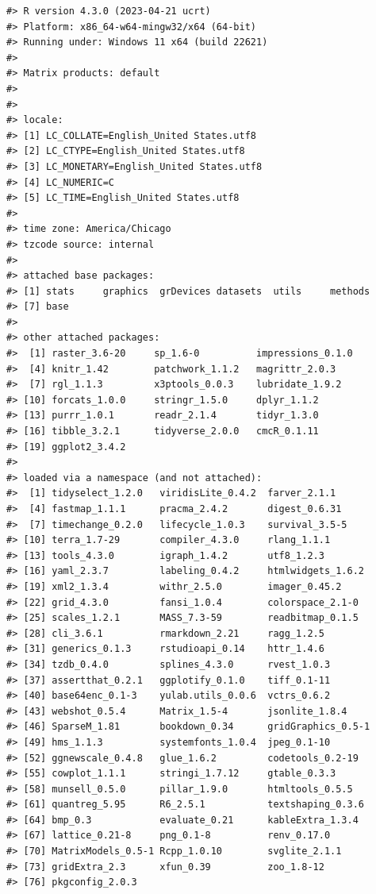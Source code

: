 \documentclass[11pt,]{isuthesis}
\begin{document}
\begin{verbatim}
#> R version 4.3.0 (2023-04-21 ucrt)
#> Platform: x86_64-w64-mingw32/x64 (64-bit)
#> Running under: Windows 11 x64 (build 22621)
#> 
#> Matrix products: default
#> 
#> 
#> locale:
#> [1] LC_COLLATE=English_United States.utf8 
#> [2] LC_CTYPE=English_United States.utf8   
#> [3] LC_MONETARY=English_United States.utf8
#> [4] LC_NUMERIC=C                          
#> [5] LC_TIME=English_United States.utf8    
#> 
#> time zone: America/Chicago
#> tzcode source: internal
#> 
#> attached base packages:
#> [1] stats     graphics  grDevices datasets  utils     methods  
#> [7] base     
#> 
#> other attached packages:
#>  [1] raster_3.6-20     sp_1.6-0          impressions_0.1.0
#>  [4] knitr_1.42        patchwork_1.1.2   magrittr_2.0.3   
#>  [7] rgl_1.1.3         x3ptools_0.0.3    lubridate_1.9.2  
#> [10] forcats_1.0.0     stringr_1.5.0     dplyr_1.1.2      
#> [13] purrr_1.0.1       readr_2.1.4       tidyr_1.3.0      
#> [16] tibble_3.2.1      tidyverse_2.0.0   cmcR_0.1.11      
#> [19] ggplot2_3.4.2    
#> 
#> loaded via a namespace (and not attached):
#>  [1] tidyselect_1.2.0   viridisLite_0.4.2  farver_2.1.1      
#>  [4] fastmap_1.1.1      pracma_2.4.2       digest_0.6.31     
#>  [7] timechange_0.2.0   lifecycle_1.0.3    survival_3.5-5    
#> [10] terra_1.7-29       compiler_4.3.0     rlang_1.1.1       
#> [13] tools_4.3.0        igraph_1.4.2       utf8_1.2.3        
#> [16] yaml_2.3.7         labeling_0.4.2     htmlwidgets_1.6.2 
#> [19] xml2_1.3.4         withr_2.5.0        imager_0.45.2     
#> [22] grid_4.3.0         fansi_1.0.4        colorspace_2.1-0  
#> [25] scales_1.2.1       MASS_7.3-59        readbitmap_0.1.5  
#> [28] cli_3.6.1          rmarkdown_2.21     ragg_1.2.5        
#> [31] generics_0.1.3     rstudioapi_0.14    httr_1.4.6        
#> [34] tzdb_0.4.0         splines_4.3.0      rvest_1.0.3       
#> [37] assertthat_0.2.1   ggplotify_0.1.0    tiff_0.1-11       
#> [40] base64enc_0.1-3    yulab.utils_0.0.6  vctrs_0.6.2       
#> [43] webshot_0.5.4      Matrix_1.5-4       jsonlite_1.8.4    
#> [46] SparseM_1.81       bookdown_0.34      gridGraphics_0.5-1
#> [49] hms_1.1.3          systemfonts_1.0.4  jpeg_0.1-10       
#> [52] ggnewscale_0.4.8   glue_1.6.2         codetools_0.2-19  
#> [55] cowplot_1.1.1      stringi_1.7.12     gtable_0.3.3      
#> [58] munsell_0.5.0      pillar_1.9.0       htmltools_0.5.5   
#> [61] quantreg_5.95      R6_2.5.1           textshaping_0.3.6 
#> [64] bmp_0.3            evaluate_0.21      kableExtra_1.3.4  
#> [67] lattice_0.21-8     png_0.1-8          renv_0.17.0       
#> [70] MatrixModels_0.5-1 Rcpp_1.0.10        svglite_2.1.1     
#> [73] gridExtra_2.3      xfun_0.39          zoo_1.8-12        
#> [76] pkgconfig_2.0.3
\end{verbatim}
\end{document}

